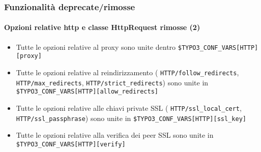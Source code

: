 \begin{frame}[fragile]
	\frametitle{Funzionalità deprecate/rimosse}
	\framesubtitle{Opzioni relative http e classe HttpRequest rimosse (2)}

	\begin{itemize}

		\item Tutte le opzioni relative al proxy sono unite dentro\newline
			\small\texttt{\$TYPO3\_CONF\_VARS[HTTP][proxy]}\normalsize

		\item Tutte le opzioni relative al reindirizzamento
			(\small
				\texttt{HTTP/follow\_redirects},
				\texttt{HTTP/max\_redirects},
				\texttt{HTTP/strict\_redirects}\normalsize)
			sono unite in
			\small
				\texttt{\$TYPO3\_CONF\_VARS[HTTP][allow\_redirects]}
			\normalsize

		\item Tutte le opzioni relative alle chiavi private SSL
			(\small
				\texttt{HTTP/ssl\_local\_cert},
				\texttt{HTTP/ssl\_passphrase}\normalsize)
			sono unite in
			\small
				\texttt{\$TYPO3\_CONF\_VARS[HTTP][ssl\_key]}
			\normalsize

		\item Tutte le opzioni relative alla verifica dei peer SSL sono unite in
			\small
				\texttt{\$TYPO3\_CONF\_VARS[HTTP][verify]}
			\normalsize

	\end{itemize}

\end{frame}


